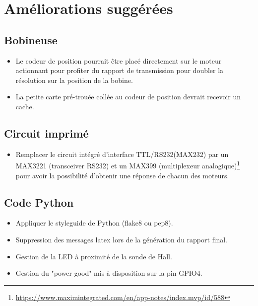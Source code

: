 \documentclass[12pt,a4paper]{article}
\begin{document}
\section{Améliorations suggérées}
\subsection{Bobineuse}
\begin{itemize}\itemsep=6pt
\item Le codeur de position pourrait être placé directement sur le moteur actionnant pour profiter du rapport de transmission pour doubler la résolution sur la position de la bobine.
\item La petite carte pré-trouée collée au codeur de position devrait recevoir un cache.
\end{itemize}


\subsection{Circuit imprimé}
\begin{itemize}\itemsep=6pt
\item Remplacer le circuit intégré d'interface TTL/RS232(MAX232) par un MAX3221 (transceiver RS232) et un MAX399 (multiplexeur analogique)\footnote{\url{https://www.maximintegrated.com/en/app-notes/index.mvp/id/588}} pour avoir la possibilité d'obtenir une réponse de chacun des moteurs. 
\end{itemize}

\subsection{Code Python}
\begin{itemize}\itemsep=6pt
\item Appliquer le styleguide de Python (flake8 ou pep8).
\item Suppression des messages latex lors de la génération du rapport final.
\item Gestion de la LED à proximité de la sonde de Hall.
\item Gestion du "power good" mis à disposition sur la pin GPIO4.
\end{itemize}
\end{document}
